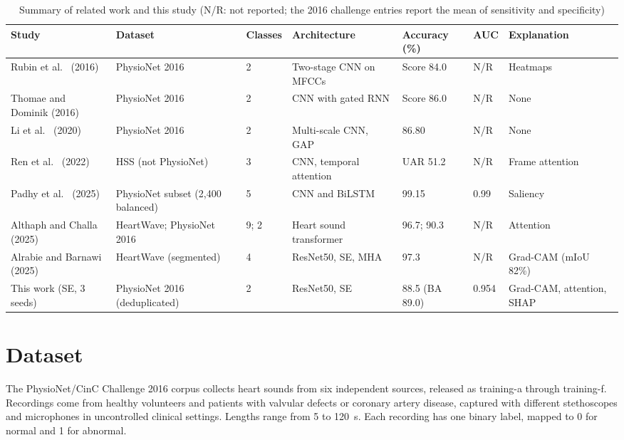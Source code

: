 \documentclass[conference]{IEEEtran}
\begin{document}
\begin{table}[t]
\caption{Summary of related work and this study (N/R: not reported; the 2016 challenge entries report the mean of sensitivity and specificity)}
\label{tab:lit}
\centering
\footnotesize
\renewcommand{\arraystretch}{1.15}
\begin{tabular}{p{2.4cm} p{3.2cm} p{0.8cm} p{3.5cm} p{2.1cm} p{1.0cm} p{2.8cm}}
\toprule
Study & Dataset & Classes & Architecture & Accuracy (\%) & AUC & Explanation \\
\midrule
Rubin et al.\ \cite{rubin} (2016) & PhysioNet 2016 & 2 & Two-stage CNN on MFCCs & Score 84.0 & N/R & Heatmaps \\
Thomae and Dominik \cite{thomae} (2016) & PhysioNet 2016 & 2 & CNN with gated RNN & Score 86.0 & N/R & None \\
Li et al.\ \cite{li} (2020) & PhysioNet 2016 & 2 & Multi-scale CNN, GAP & 86.80 & N/R & None \\
Ren et al.\ \cite{ren} (2022) & HSS (not PhysioNet) & 3 & CNN, temporal attention & UAR 51.2 & N/R & Frame attention \\
Padhy et al.\ \cite{padhy} (2025) & PhysioNet subset (2,400 balanced) & 5 & CNN and BiLSTM & 99.15 & 0.99 & Saliency \\
Althaph and Challa \cite{althaph} (2025) & HeartWave; PhysioNet 2016 & 9; 2 & Heart sound transformer & 96.7; 90.3 & N/R & Attention \\
Alrabie and Barnawi \cite{alrabie} (2025) & HeartWave (segmented) & 4 & ResNet50, SE, MHA & 97.3 & N/R & Grad-CAM (mIoU 82\%) \\
This work (SE, 3 seeds) & PhysioNet 2016 (deduplicated) & 2 & ResNet50, SE & 88.5 (BA 89.0) & 0.954 & Grad-CAM, attention, SHAP \\
\bottomrule
\end{tabular}
\end{table}

\section{Dataset}
\label{sec:data}
The PhysioNet/CinC Challenge 2016 corpus \cite{clifford,liu} collects heart sounds from six independent sources, released as training-a through training-f. Recordings come from healthy volunteers and patients with valvular defects or coronary artery disease, captured with different stethoscopes and microphones in uncontrolled clinical settings. Lengths range from 5 to 120~s. Each recording has one binary label, mapped to 0 for normal and 1 for abnormal.
\end{document}

